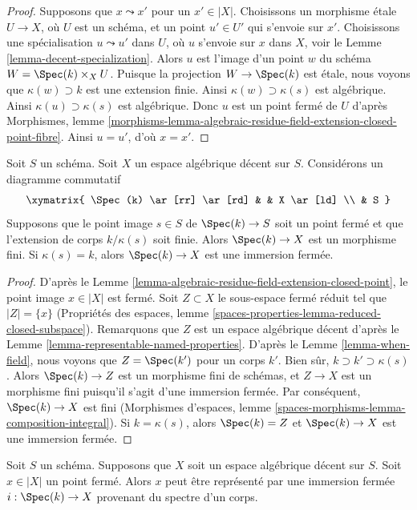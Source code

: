 \begin{proof}
Supposons que $x \leadsto x'$ pour un $x' \in |X|$. Choisissons un
morphisme étale $U \to X$, où $U$ est un schéma, et un point $u' \in U'$
qui s'envoie sur $x'$. Choisissons une spécialisation $u \leadsto u'$ dans
$U$, où $u$ s'envoie sur $x$ dans $X$, voir le
Lemme \ref{lemma-decent-specialization}.
Alors $u$ est l'image d'un point $w$ du schéma
$W = \Spec(k) \times_X U$. Puisque la projection $W \to \Spec(k)$ est étale,
nous voyons que $\kappa(w) \supset k$ est une extension finie. Ainsi
$\kappa(w) \supset \kappa(s)$ est algébrique. Ainsi
$\kappa(u) \supset \kappa(s)$ est algébrique. Donc $u$ est un point fermé de
$U$ d'après Morphismes, lemme
\ref{morphisms-lemma-algebraic-residue-field-extension-closed-point-fibre}.
Ainsi $u = u'$, d'où $x = x'$.
\end{proof}

\begin{lemma}
\label{lemma-finite-residue-field-extension-finite}
Soit $S$ un schéma. Soit $X$ un espace algébrique décent sur $S$.
Considérons un diagramme commutatif
$$
\xymatrix{
\Spec(k) \ar[rr] \ar[rd] & & X \ar[ld] \\
& S
}
$$
Supposons que le point image $s \in S$ de $\Spec(k) \to S$ soit un point
fermé et que l'extension de corps $k/\kappa(s)$ soit finie.
Alors $\Spec(k) \to X$ est un morphisme fini. Si $\kappa(s) = k$,
alors $\Spec(k) \to X$ est une immersion fermée.
\end{lemma}

\begin{proof}
D'après le Lemme \ref{lemma-algebraic-residue-field-extension-closed-point},
le point image $x \in |X|$ est fermé. Soit $Z \subset X$ le sous-espace
fermé réduit tel que $|Z| = \{x\}$ (Propriétés des espaces,
lemme \ref{spaces-properties-lemma-reduced-closed-subspace}).
Remarquons que $Z$ est un espace algébrique décent d'après le
Lemme \ref{lemma-representable-named-properties}.
D'après le Lemme \ref{lemma-when-field}, nous voyons que
$Z = \Spec(k')$ pour un corps $k'$. Bien sûr,
$k \supset k' \supset \kappa(s)$. Alors $\Spec(k) \to Z$ est un morphisme
fini de schémas, et $Z \to X$ est un morphisme fini puisqu'il s'agit d'une
immersion fermée. Par conséquent, $\Spec(k) \to X$ est fini (Morphismes
d'espaces, lemme \ref{spaces-morphisms-lemma-composition-integral}).
Si $k = \kappa(s)$, alors $\Spec(k) = Z$ et $\Spec(k) \to X$ est une
immersion fermée.
\end{proof}

\begin{lemma}
\label{lemma-decent-space-closed-point}
Soit $S$ un schéma. Supposons que $X$ soit un espace algébrique décent sur
$S$. Soit $x \in |X|$ un point fermé. Alors $x$ peut être représenté par une
immersion fermée $i : \Spec(k) \to X$ provenant du spectre d'un corps.
\end{lemma}

